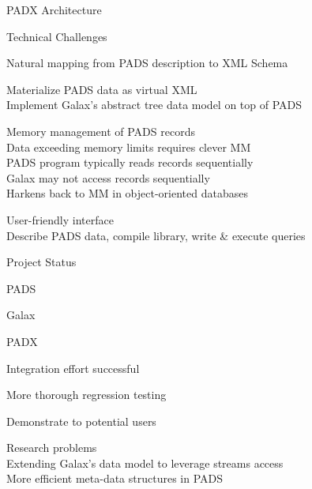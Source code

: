 \documentclass[landscape]{slides}
\begin{document}
\begin{Slide}{PADX Architecture} 
  \centerline{}
\end{Slide}

\begin{Slide}{Technical Challenges}

  \bb Natural mapping from PADS description to XML Schema 

  \bb Materialize PADS data as virtual XML \\
  \bbb Implement Galax's abstract tree data model on top of PADS 

  \bb Memory management of PADS records \\
  \bbb Data exceeding memory limits requires clever MM\\
  \bbb PADS program typically reads records sequentially \\
  \bbb Galax may not access records sequentially \\
  \bbb Harkens back to MM in object-oriented databases

  \bb User-friendly interface\\
  \bbb Describe PADS data, compile library, write \& execute queries
\end{Slide}

\begin{Slide}{Project Status}

\bb PADS

\bb Galax

\bb PADX

\bb Integration effort successful 

\bb More thorough regression testing

\bb Demonstrate to potential users

\bb Research problems\\
\bbb Extending Galax's data model to leverage streams access\\
\bbb More efficient meta-data structures in PADS 

\end{Slide}
\end{document}
